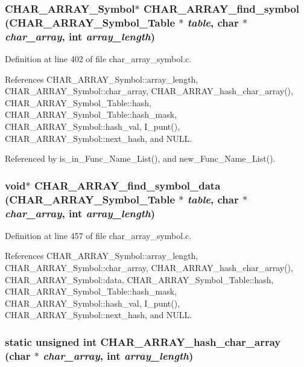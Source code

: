 \subsubsection{\setlength{\rightskip}{0pt plus 5cm}\bf{CHAR\_\-ARRAY\_\-Symbol}$\ast$ CHAR\_\-ARRAY\_\-find\_\-symbol (\bf{CHAR\_\-ARRAY\_\-Symbol\_\-Table} $\ast$ {\em table}, char $\ast$ {\em char\_\-array}, int {\em array\_\-length})}\label{char__array__symbol_8c_c71b29cfaaab8587714941d516de2424}




Definition at line 402 of file char\_\-array\_\-symbol.c.

References CHAR\_\-ARRAY\_\-Symbol::array\_\-length, CHAR\_\-ARRAY\_\-Symbol::char\_\-array, CHAR\_\-ARRAY\_\-hash\_\-char\_\-array(), CHAR\_\-ARRAY\_\-Symbol\_\-Table::hash, CHAR\_\-ARRAY\_\-Symbol\_\-Table::hash\_\-mask, CHAR\_\-ARRAY\_\-Symbol::hash\_\-val, I\_\-punt(), CHAR\_\-ARRAY\_\-Symbol::next\_\-hash, and NULL.

Referenced by is\_\-in\_\-Func\_\-Name\_\-List(), and new\_\-Func\_\-Name\_\-List().
\subsubsection{\setlength{\rightskip}{0pt plus 5cm}void$\ast$ CHAR\_\-ARRAY\_\-find\_\-symbol\_\-data (\bf{CHAR\_\-ARRAY\_\-Symbol\_\-Table} $\ast$ {\em table}, char $\ast$ {\em char\_\-array}, int {\em array\_\-length})}\label{char__array__symbol_8c_b546ec2032db6c4b254c1ab5c507d294}




Definition at line 457 of file char\_\-array\_\-symbol.c.

References CHAR\_\-ARRAY\_\-Symbol::array\_\-length, CHAR\_\-ARRAY\_\-Symbol::char\_\-array, CHAR\_\-ARRAY\_\-hash\_\-char\_\-array(), CHAR\_\-ARRAY\_\-Symbol::data, CHAR\_\-ARRAY\_\-Symbol\_\-Table::hash, CHAR\_\-ARRAY\_\-Symbol\_\-Table::hash\_\-mask, CHAR\_\-ARRAY\_\-Symbol::hash\_\-val, I\_\-punt(), CHAR\_\-ARRAY\_\-Symbol::next\_\-hash, and NULL.
\subsubsection{\setlength{\rightskip}{0pt plus 5cm}static unsigned int CHAR\_\-ARRAY\_\-hash\_\-char\_\-array (char $\ast$ {\em char\_\-array}, int {\em array\_\-length})\hspace{0.3cm}{\tt  [static]}}\label{char__array__symbol_8c_b0bf626c112e061c6b390372e10a1923}




